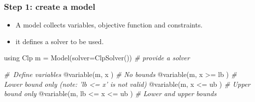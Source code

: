\documentclass[11pt]{article}
\providecommand{\tightlist}{%
      \setlength{\itemsep}{0pt}\setlength{\parskip}{0pt}}
\newenvironment{Shaded}{}{}
\newcommand{\CommentTok}[1]{\textcolor[rgb]{0.38,0.63,0.69}{\textit{{#1}}}}
\newcommand{\NormalTok}[1]{{#1}}
\begin{document}
\subsubsection{Step 1: create a model}\label{step-1-create-a-model}

\begin{itemize}
\tightlist
\item
  A model collects variables, objective function and constraints.
\item
  it defines a solver to be used.
\end{itemize}

    \begin{Shaded}
\begin{Highlighting}[]
\NormalTok{using Clp}
\NormalTok{m = Model(solver=ClpSolver())  }\CommentTok{# provide a solver}

\CommentTok{# Define variables}
\NormalTok{@variable(m, x )              }\CommentTok{# No bounds}
\NormalTok{@variable(m, x >= lb )        }\CommentTok{# Lower bound only (note: 'lb <= x' is not valid)}
\NormalTok{@variable(m, x <= ub )        }\CommentTok{# Upper bound only}
\NormalTok{@variable(m, lb <= x <= ub )  }\CommentTok{# Lower and upper bounds}
\end{Highlighting}
\end{Shaded}
\end{document}
